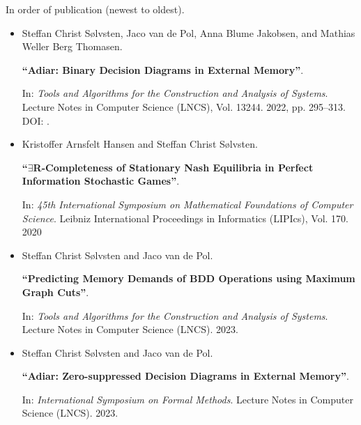 \newpage
\begin{fullwidth}
  In order of publication (newest to oldest).

  \divider


  \begin{itemize}
  \normalsize

  \item Steffan Christ Sølvsten, Jaco van de Pol, Anna Blume Jakobsen, and Mathias Weller Berg Thomasen.

        {\bf ``Adiar: Binary Decision Diagrams in External Memory''}.

        In: \emph{Tools and Algorithms for the Construction and Analysis of
        Systems}. Lecture Notes in Computer Science (LNCS), Vol. 13244. 2022,
        pp. 295--313.
        DOI: .

        \divider

  \item Kristoffer Arnsfelt Hansen and Steffan Christ Sølvsten.

        {\bf ``$\exists$R-Completeness of Stationary Nash Equilibria in Perfect
        Information Stochastic Games''}.

        In: \emph{45th International Symposium on Mathematical Foundations of
        Computer Science}. Leibniz International Proceedings in Informatics
        (LIPIcs), Vol. 170. 2020

  \end{itemize}

  \divider


  \begin{itemize}
  \normalsize

  \item Steffan Christ Sølvsten and Jaco van de Pol.

        {\bf ``Predicting Memory Demands of BDD Operations using Maximum Graph
        Cuts''}.

        In: \emph{Tools and Algorithms for the Construction and Analysis of
        Systems}. Lecture Notes in Computer Science (LNCS). 2023.

        \divider

  \item Steffan Christ Sølvsten and Jaco van de Pol.

        {\bf ``Adiar: Zero-suppressed Decision Diagrams in External Memory''}.

        In: \emph{International Symposium on Formal Methods}. Lecture Notes in
        Computer Science (LNCS). 2023.

  \end{itemize}


\end{fullwidth}


